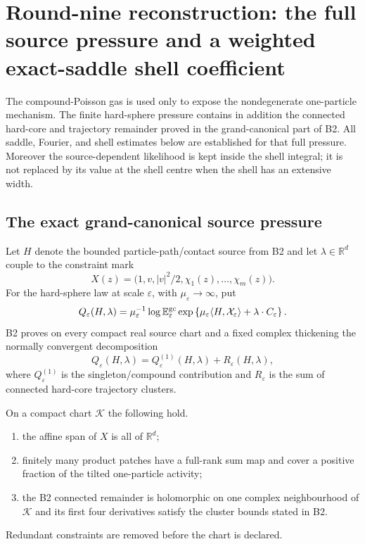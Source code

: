 \section{Round-nine reconstruction: the full source pressure and a weighted exact-saddle shell coefficient}
\label{sec:r9-b1}

The compound-Poisson gas is used only to expose the nondegenerate one-particle
mechanism.  The finite hard-sphere pressure contains in addition the connected
hard-core and trajectory remainder proved in the grand-canonical part of B2.
All saddle, Fourier, and shell estimates below are established for that full
pressure.  Moreover the source-dependent likelihood is kept inside the shell
integral; it is not replaced by its value at the shell centre when the shell
has an extensive width.

\subsection{The exact grand-canonical source pressure}

Let $H$ denote the bounded particle-path/contact source from B2 and let
$\lambda\in\mathbb R^d$ couple to the constraint mark
\[
 X(z)=\bigl(1,v,|v|^2/2,\chi_1(z),\ldots,\chi_m(z)\bigr).
\]
For the hard-sphere law at scale $\varepsilon$, with
$\mu_\varepsilon\to\infty$, put
\[
 Q_\varepsilon(H,\lambda)
 =\mu_\varepsilon^{-1}\log
 \mathbb E^{\rm gc}_\varepsilon
 \exp\left\{
   \mu_\varepsilon\langle H,\mathcal X_\varepsilon\rangle
   +\lambda\cdot C_\varepsilon
 \right\}.
\]
B2 proves on every compact real source chart and a fixed complex thickening the
normally convergent decomposition
\[
 Q_\varepsilon(H,\lambda)
 =Q^{(1)}_\varepsilon(H,\lambda)
  +R_\varepsilon(H,\lambda),
\]
where $Q^{(1)}_\varepsilon$ is the singleton/compound contribution and
$R_\varepsilon$ is the sum of connected hard-core trajectory clusters.

\begin{assumption}
\label{ass:r9-b1-admissible}
On a compact chart $\mathcal K$ the following hold.
\begin{enumerate}[label=(\roman*)]
\item the affine span of $X$ is all of $\mathbb R^d$;
\item finitely many product patches have a full-rank sum map and cover a
positive fraction of the tilted one-particle activity;
\item the B2 connected remainder is holomorphic on one complex neighbourhood
of $\mathcal K$ and its first four derivatives satisfy the cluster bounds
stated in B2.
\end{enumerate}
Redundant constraints are removed before the chart is declared.
\end{assumption}

